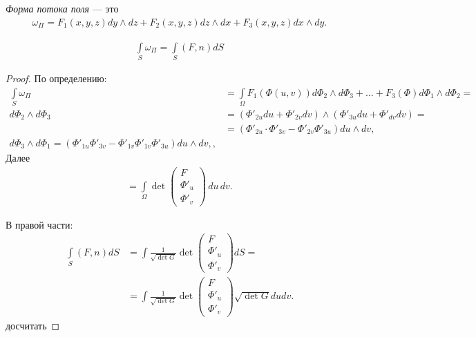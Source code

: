 \begin{df}
 \textit{Форма потока поля} --- это
 \begin{align*}
  \omega_{\Pi} = F_1(x,y,z) dy \land dz + F_2(x,y,z) dz \land dx + F_3(x,y,z) dx \land dy
 .\end{align*} 
\end{df}
\begin{claim}
 \begin{align*}
  \int\limits_{S} \omega_{\Pi} = \int\limits_{S} (F, n) dS
 \end{align*} 
\end{claim}
\begin{proof}
 По определению:
 \begin{align*}
  \int\limits_{S} \omega_{\Pi} &= \int\limits_{\Omega} F_1(\Phi(u,v)) d\Phi_2 \land d\Phi_3 + \ldots + F_3(\Phi) d \Phi_1 \land d\Phi_2 = \\
  d\Phi_2 \land d\Phi_3 &= (\Phi'_{2u} du + \Phi'_{2v} dv) \land (\Phi'_{3u} du + \Phi'_{dv} dv) = \\
  &= \left( \Phi'_{2u} \cdot \Phi'_{3v} - \Phi'_{2v} \Phi'_{3u} \right) du \land dv, \\
  d\Phi_3 \land d\Phi_1 = \left( \Phi'_{1u} \Phi'_{3v} - \Phi'_{1v} \Phi'_{1v}\Phi'_{3u} \right) du \land dv,
 ,\end{align*} Далее
 \begin{align*}
  = \int\limits_{\Omega} \det \begin{pmatrix}
   F \\
   \Phi'_u \\
   \Phi'_v
  \end{pmatrix} \, du \, dv
 .\end{align*} 

 В правой части:
 \begin{align*}
  \int\limits_{S} (F, n) dS &= \int\limits \frac{1}{\sqrt{\det G} } \det \begin{pmatrix}
   F \\
   \Phi'_u \\
   \Phi'_v
  \end{pmatrix} dS = \\
  &= \int \frac{1}{\sqrt { \det G }} \det \begin{pmatrix}
   F \\
   \Phi'_u \\
   \Phi'_v
  \end{pmatrix} \sqrt{\det G} du dv
 .\end{align*} {\color{red} досчитать}
\end{proof}

